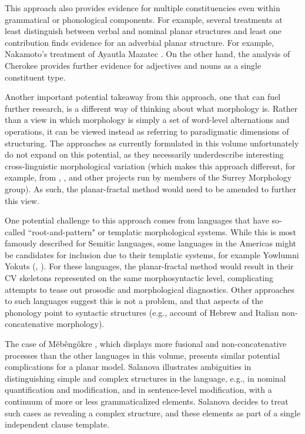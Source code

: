 \documentclass[output=paper]{langscibook}
\begin{document}
This approach also provides evidence for multiple constituencies even within grammatical or phonological components. For example, several treatments at least distinguish between verbal and nominal planar structures and least one contribution finds evidence for an adverbial planar structure. For example, Nakamo\-to's treatment of Ayautla Mazatec . On the other hand, the analysis of Cherokee  provides further evidence for adjectives and nouns as a single constituent type.

Another important potential takeaway from this approach, one that can fuel further research, is a different way of thinking about what morphology is. Rather than a view in which morphology is simply a set of word-level alternations and operations, it can be viewed instead as referring to paradigmatic dimensions of structuring. The approaches as currently formulated in this volume unfortunately do not expand on this potential, as they necessarily underdescribe interesting cross-linguistic morphological variation (which makes this approach different, for example, from \citealt{baerman_covert_2014}, \citealt{corbett_morphosyntactic_2015}, and other projects run by members of the Surrey Morphology group). As such, the planar-fractal method would need to be amended to further this view.

One potential challenge to this approach comes from languages that have so-called ``root-and-pattern" or templatic morphological systems. While this is most famously described for Semitic languages, some languages in the Americas might be candidates for inclusion due to their templatic systems, for example Yowlumni Yokuts (\citealt{kuroda_yawelmani_1967}, \citealt{archangeli_syllabification_1992}). For these languages, the planar-fractal method would result in their CV skeletons represented on the same morphosyntactic level, complicating attempts to tease out prosodic and morphological diagnostics. Other approaches to such languages suggest this is not a problem, and that aspects of the phonology point to syntactic structures (e.g., \citealt{faust_how_2009} account of Hebrew and Italian non-concatenative morphology).

The case of Mẽbêngôkre , which displays more fusional and non-concatenative processes than the other languages in this volume, presents similar potential complications for a planar model. Salanova illustrates ambiguities in distinguishing simple and complex structures in the language, e.g., in nominal quantification and modification, and in sentence-level modification, with a continuum of more or less grammaticalized elements. Salanova decides to treat such cases as revealing a complex structure, and these elements as part of a single independent clause template.
\end{document}
